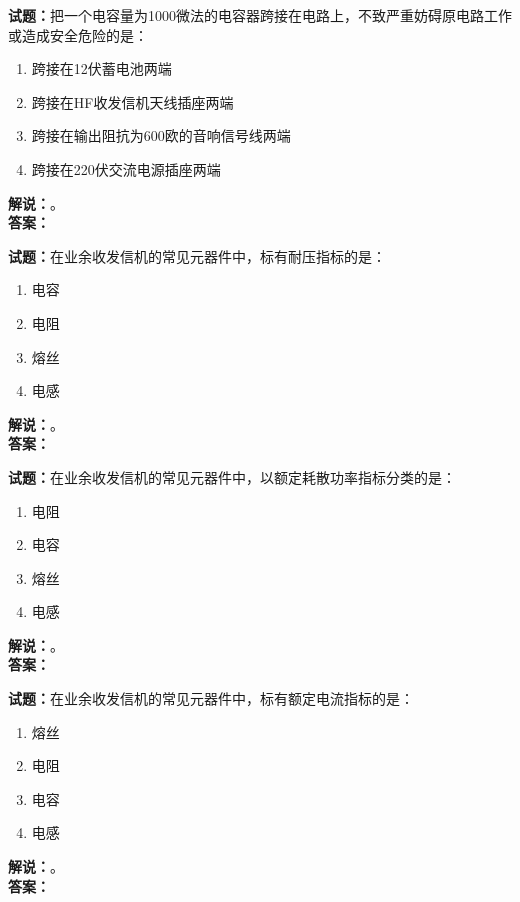 \documentclass{ctexbook}
\begin{document}
\bigskip

\noindent\textbf{试题：}把一个电容量为1000微法的电容器跨接在电路上，不致严重妨碍原电路工作或造成安全危险的是：
\begin{enumerate}[leftmargin=3em]
  \item 跨接在12伏蓄电池两端
  \item 跨接在HF收发信机天线插座两端
  \item 跨接在输出阻抗为600欧的音响信号线两端
  \item 跨接在220伏交流电源插座两端
\end{enumerate}
\noindent\textbf{解说：}\textbf{}。\\\noindent\textbf{答案：}

\bigskip

\noindent\textbf{试题：}在业余收发信机的常见元器件中，标有耐压指标的是：
\begin{enumerate}[leftmargin=3em]
  \item 电容
  \item 电阻
  \item 熔丝
  \item 电感
\end{enumerate}
\noindent\textbf{解说：}\textbf{}。\\\noindent\textbf{答案：}

\bigskip

\noindent\textbf{试题：}在业余收发信机的常见元器件中，以额定耗散功率指标分类的是：
\begin{enumerate}[leftmargin=3em]
  \item 电阻
  \item 电容
  \item 熔丝
  \item 电感
\end{enumerate}
\noindent\textbf{解说：}\textbf{}。\\\noindent\textbf{答案：}

\bigskip

\noindent\textbf{试题：}在业余收发信机的常见元器件中，标有额定电流指标的是：
\begin{enumerate}[leftmargin=3em]
  \item 熔丝
  \item 电阻
  \item 电容
  \item 电感
\end{enumerate}
\noindent\textbf{解说：}\textbf{}。\\\noindent\textbf{答案：}

\bigskip
\end{document}
